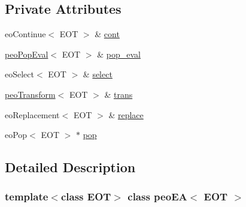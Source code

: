 \subsection*{Private Attributes}
\begin{CompactItemize}
\item 
\hypertarget{classpeoEA_5f015eebf42f176b9fe322488c446c2a}{
eo\-Continue$<$ EOT $>$ \& \hyperlink{classpeoEA_5f015eebf42f176b9fe322488c446c2a}{cont}}
\label{classpeoEA_5f015eebf42f176b9fe322488c446c2a}

\item 
\hypertarget{classpeoEA_9140259f50c9186edcb062b023624c96}{
\hyperlink{classpeoPopEval}{peo\-Pop\-Eval}$<$ EOT $>$ \& \hyperlink{classpeoEA_9140259f50c9186edcb062b023624c96}{pop\_\-eval}}
\label{classpeoEA_9140259f50c9186edcb062b023624c96}

\item 
\hypertarget{classpeoEA_2d8428d69fdd6aefefbaf543fdd46d19}{
eo\-Select$<$ EOT $>$ \& \hyperlink{classpeoEA_2d8428d69fdd6aefefbaf543fdd46d19}{select}}
\label{classpeoEA_2d8428d69fdd6aefefbaf543fdd46d19}

\item 
\hypertarget{classpeoEA_713c77935eb8aafebfb9488cfaa4a363}{
\hyperlink{classpeoTransform}{peo\-Transform}$<$ EOT $>$ \& \hyperlink{classpeoEA_713c77935eb8aafebfb9488cfaa4a363}{trans}}
\label{classpeoEA_713c77935eb8aafebfb9488cfaa4a363}

\item 
\hypertarget{classpeoEA_9bd2d4356cf7e69e3141dc269213aa8a}{
eo\-Replacement$<$ EOT $>$ \& \hyperlink{classpeoEA_9bd2d4356cf7e69e3141dc269213aa8a}{replace}}
\label{classpeoEA_9bd2d4356cf7e69e3141dc269213aa8a}

\item 
\hypertarget{classpeoEA_c0b110e410bc16283e8339f24b733772}{
eo\-Pop$<$ EOT $>$ $\ast$ \hyperlink{classpeoEA_c0b110e410bc16283e8339f24b733772}{pop}}
\label{classpeoEA_c0b110e410bc16283e8339f24b733772}

\end{CompactItemize}


\subsection{Detailed Description}
\subsubsection*{template$<$class EOT$>$ class peo\-EA$<$ EOT $>$}

